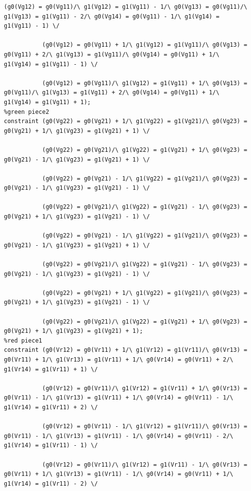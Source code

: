 \begin{appendices}
\begin{lstlisting}[language=minizinc]
           (g0(Vg12) = g0(Vg11)/\ g1(Vg12) = g1(Vg11) - 1/\ g0(Vg13) = g0(Vg11)/\ g1(Vg13) = g1(Vg11) - 2/\ g0(Vg14) = g0(Vg11) - 1/\ g1(Vg14) = g1(Vg11) - 1) \/
            
           (g0(Vg12) = g0(Vg11) + 1/\ g1(Vg12) = g1(Vg11)/\ g0(Vg13) = g0(Vg11) + 2/\ g1(Vg13) = g1(Vg11)/\ g0(Vg14) = g0(Vg11) + 1/\ g1(Vg14) = g1(Vg11) - 1) \/
            
           (g0(Vg12) = g0(Vg11)/\ g1(Vg12) = g1(Vg11) + 1/\ g0(Vg13) = g0(Vg11)/\ g1(Vg13) = g1(Vg11) + 2/\ g0(Vg14) = g0(Vg11) + 1/\ g1(Vg14) = g1(Vg11) + 1);
%green piece2           
constraint (g0(Vg22) = g0(Vg21) + 1/\ g1(Vg22) = g1(Vg21)/\ g0(Vg23) = g0(Vg21) + 1/\ g1(Vg23) = g1(Vg21) + 1) \/

           (g0(Vg22) = g0(Vg21)/\ g1(Vg22) = g1(Vg21) + 1/\ g0(Vg23) = g0(Vg21) - 1/\ g1(Vg23) = g1(Vg21) + 1) \/
           
           (g0(Vg22) = g0(Vg21) - 1/\ g1(Vg22) = g1(Vg21)/\ g0(Vg23) = g0(Vg21) - 1/\ g1(Vg23) = g1(Vg21) - 1) \/
           
           (g0(Vg22) = g0(Vg21)/\ g1(Vg22) = g1(Vg21) - 1/\ g0(Vg23) = g0(Vg21) + 1/\ g1(Vg23) = g1(Vg21) - 1) \/
           
           (g0(Vg22) = g0(Vg21) - 1/\ g1(Vg22) = g1(Vg21)/\ g0(Vg23) = g0(Vg21) - 1/\ g1(Vg23) = g1(Vg21) + 1) \/
           
           (g0(Vg22) = g0(Vg21)/\ g1(Vg22) = g1(Vg21) - 1/\ g0(Vg23) = g0(Vg21) - 1/\ g1(Vg23) = g1(Vg21) - 1) \/
           
           (g0(Vg22) = g0(Vg21) + 1/\ g1(Vg22) = g1(Vg21)/\ g0(Vg23) = g0(Vg21) + 1/\ g1(Vg23) = g1(Vg21) - 1) \/
           
           (g0(Vg22) = g0(Vg21)/\ g1(Vg22) = g1(Vg21) + 1/\ g0(Vg23) = g0(Vg21) + 1/\ g1(Vg23) = g1(Vg21) + 1);
%red piece1           
constraint (g0(Vr12) = g0(Vr11) + 1/\ g1(Vr12) = g1(Vr11)/\ g0(Vr13) = g0(Vr11) + 1/\ g1(Vr13) = g1(Vr11) + 1/\ g0(Vr14) = g0(Vr11) + 2/\ g1(Vr14) = g1(Vr11) + 1) \/
           
           (g0(Vr12) = g0(Vr11)/\ g1(Vr12) = g1(Vr11) + 1/\ g0(Vr13) = g0(Vr11) - 1/\ g1(Vr13) = g1(Vr11) + 1/\ g0(Vr14) = g0(Vr11) - 1/\ g1(Vr14) = g1(Vr11) + 2) \/
                           
           (g0(Vr12) = g0(Vr11) - 1/\ g1(Vr12) = g1(Vr11)/\ g0(Vr13) = g0(Vr11) - 1/\ g1(Vr13) = g1(Vr11) - 1/\ g0(Vr14) = g0(Vr11) - 2/\ g1(Vr14) = g1(Vr11) - 1) \/
           
           (g0(Vr12) = g0(Vr11)/\ g1(Vr12) = g1(Vr11) - 1/\ g0(Vr13) = g0(Vr11) + 1/\ g1(Vr13) = g1(Vr11) - 1/\ g0(Vr14) = g0(Vr11) + 1/\ g1(Vr14) = g1(Vr11) - 2) \/
           

\end{lstlisting}
\end{appendices}
